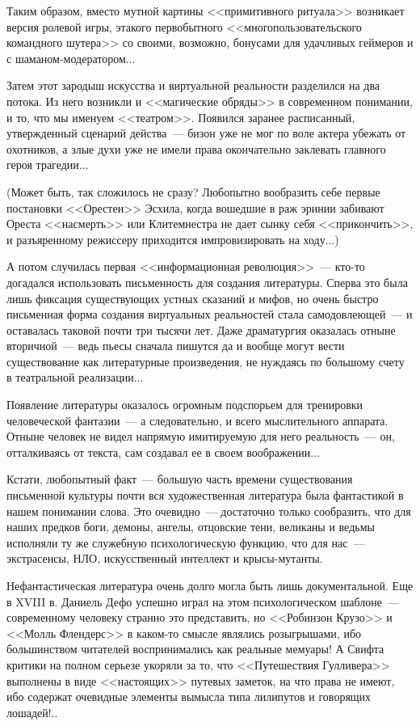 \documentclass{scrbook}
\newcommand{\flqq}{<<}
\newcommand{\frqq}{>>}
\newcommand{\mdash}{~--- }
\begin{document}
Таким образом, вместо мутной картины {\flqq}примитивного ритуала{\frqq} возникает версия ролевой игры, этакого первобытного {\flqq}многопользовательского командного шутера{\frqq} со своими, возможно, бонусами для удачливых геймеров и с шаманом-модератором...

Затем этот зародыш искусства и виртуальной реальности разделился на два потока. Из него возникли и {\flqq}магические обряды{\frqq} в современном понимании, и то, что мы именуем {\flqq}театром{\frqq}. Появился заранее расписанный, утвержденный сценарий действа{\mdash}бизон уже не мог по воле актера убежать от охотников, а злые духи уже не имели права окончательно заклевать главного героя трагедии...

(Может быть, так сложилось не сразу? Любопытно вообразить себе первые постановки {\flqq}Орестеи{\frqq} Эсхила, когда вошедшие в раж эринии забивают Ореста {\flqq}насмерть{\frqq} или Клитемнестра не дает сынку себя {\flqq}прикончить{\frqq}, и разъяренному режиссеру приходится импровизировать на ходу...)

А потом случилась первая {\flqq}информационная революция{\frqq}{\mdash}кто-то догадался использовать письменность для создания литературы. Сперва это была лишь фиксация существующих устных сказаний и мифов, но очень быстро письменная форма создания виртуальных реальностей стала самодовлеющей{\mdash}и оставалась таковой почти три тысячи лет. Даже драматургия оказалась отныне вторичной{\mdash}ведь пьесы сначала пишутся да и вообще могут вести существование как литературные произведения, не нуждаясь по большому счету в театральной реализации...

Появление литературы оказалось огромным подспорьем для тренировки человеческой фантазии{\mdash}а следовательно, и всего мыслительного аппарата. Отныне человек не видел напрямую имитируемую для него реальность{\mdash}он, отталкиваясь от текста, сам создавал ее в своем воображении...

Кстати, любопытный факт{\mdash}большую часть времени существования письменной культуры почти вся художественная литература была фантастикой в нашем понимании слова. Это очевидно{\mdash}достаточно только сообразить, что для наших предков боги, демоны, ангелы, отцовские тени, великаны и ведьмы исполняли ту же служебную психологическую функцию, что для нас{\mdash}экстрасенсы, НЛО, искусственный интеллект и крысы-мутанты.

Нефантастическая литература очень долго могла быть лишь документальной. Еще в XVIII в. Даниель Дефо успешно играл на этом психологическом шаблоне{\mdash}современному человеку странно это представить, но {\flqq}Робинзон Крузо{\frqq} и {\flqq}Молль Флендерс{\frqq} в каком-то смысле являлись розыгрышами, ибо большинством читателей воспринимались как реальные мемуары! А Свифта критики на полном серьезе укоряли за то, что {\flqq}Путешествия Гулливера{\frqq} выполнены в виде {\flqq}настоящих{\frqq} путевых заметок, на что права не имеют, ибо содержат очевидные элементы вымысла типа лилипутов и говорящих лошадей!..
\end{document}
